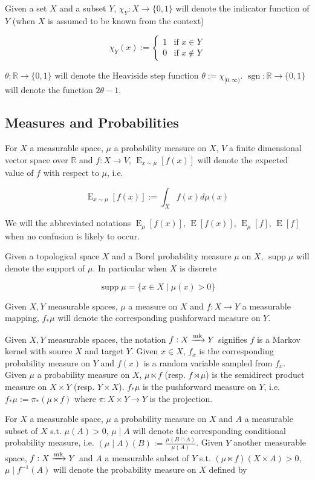 \documentclass{article}
\numberwithin{equation}{section}
\theoremstyle{definition}
\theoremstyle{plain}
\newcommand{\Bool}{\{0,1\}}
\DeclareMathOperator{\Sgn}{sgn}
\DeclareMathOperator{\Supp}{supp}
\DeclareMathOperator{\E}{E}
\newcommand{\Reals}{\mathbb{R}}
\newcommand{\Markov}{\xrightarrow{\textnormal{mk}}}
\begin{document}
Given a set $X$ and a subset $Y$, $\chi_Y: X \rightarrow \Bool$ will denote the indicator function of $Y$ (when $X$ is assumed to be known from the context)

$$\chi_Y(x):=\begin{cases}1 & \text{if } x \in Y \\ 0 & \text{if } x \not\in Y \end{cases}$$

$\theta: \Reals \rightarrow \Bool$ will denote the Heaviside step function $\theta:=\chi_{[0,\infty)}$. ${\Sgn: \Reals \rightarrow \Bool}$ will denote the function $2 \theta - 1$.
\subsection{Measures and Probabilities}

For $X$ a measurable space, $\mu$ a probability measure on $X$, $V$ a finite dimensional vector space over $\Reals$ and $f: X \rightarrow V$, $\E_{x \sim \mu}[f(x)]$ will denote the expected value of $f$ with respect to $\mu$, i.e. 

\[\E_{x \sim \mu}[f(x)] := \int_X f(x) d\mu(x)\]

We will the abbreviated notations $\E_\mu[f(x)]$, $\E[f(x)]$, $\E_\mu[f]$, $\E[f]$ when no confusion is likely to occur.

Given a topological space $X$ and a Borel probability measure $\mu$ on $X$, $\Supp \mu$ will denote the support of $\mu$. In particular when $X$ is discrete

\[\Supp \mu = \{x \in X \mid \mu(x) > 0\}\]

Given $X,Y$ measurable spaces, $\mu$ a measure on $X$ and $f: X \rightarrow Y$ a measurable mapping, $f_*\mu$ will denote the corresponding pushforward measure on $Y$.

Given $X,Y$ measurable spaces, the notation $f: X \xrightarrow{\textnormal{mk}} Y$ signifies $f$ is a Markov kernel with source $X$ and target $Y$. Given $x \in X$, $f_x$ is the corresponding probability measure on $Y$ and $f(x)$ is a random variable sampled from $f_x$. Given $\mu$ a probability measure on $X$, $\mu \ltimes f$ (resp. $f \rtimes \mu$) is the semidirect product measure on $X \times Y$ (resp. $Y \times X$). $f_*\mu$ is the pushforward measure on $Y$, i.e. $f_*\mu:=\pi_*(\mu \ltimes f)$ where $\pi: X \times Y \rightarrow Y$ is the projection.

For $X$ a measurable space, $\mu$ a probability measure on $X$ and $A$ a measurable subset of $X$ s.t. ${\mu(A) > 0}$, $\mu \mid A$ will denote the corresponding conditional probability measure, i.e. $(\mu \mid A)(B):=\frac{\mu(B \cap A)}{\mu(A)}$. Given $Y$ another measurable space, $f: X \Markov Y$ and $A$ a measurable subset of $Y$ s.t. $(\mu \ltimes f)(X \times A) > 0$, $\mu \mid f^{-1}(A)$ will denote the probability measure on $X$ defined by 
\end{document}
